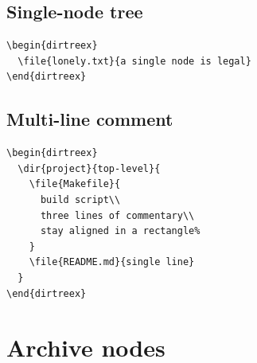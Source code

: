 \documentclass[11pt]{article}
\begin{document}
\begin{dirtreex}
\end{dirtreex}

\subsection{Single-node tree}

\begin{Verbatim}
\begin{dirtreex}
  \file{lonely.txt}{a single node is legal}
\end{dirtreex}
\end{Verbatim}

\begin{dirtreex}
\end{dirtreex}

\subsection{Multi-line comment}

\begin{Verbatim}
\begin{dirtreex}
  \dir{project}{top-level}{
    \file{Makefile}{
      build script\\
      three lines of commentary\\
      stay aligned in a rectangle%
    }
    \file{README.md}{single line}
  }
\end{dirtreex}
\end{Verbatim}

\begin{dirtreex}
\end{dirtreex}

\clearpage

\section{Archive nodes}
\end{document}
